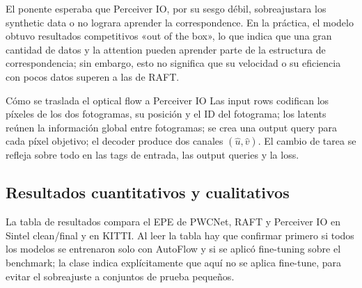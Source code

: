 El ponente esperaba que Perceiver IO, por su sesgo débil, sobreajustara los synthetic data o no lograra aprender la correspondence. En la práctica, el modelo obtuvo resultados competitivos «out of the box», lo que indica que una gran cantidad de datos y la attention pueden aprender parte de la estructura de correspondencia; sin embargo, esto no significa que su velocidad o su eficiencia con pocos datos superen a las de RAFT.



\begin{importantbox}{Cómo se traslada el optical flow a Perceiver IO}
Las input rows codifican los píxeles de los dos fotogramas, su posición y el ID del fotograma; los latents reúnen la información global entre fotogramas; se crea una output query para cada píxel objetivo; el decoder produce dos canales $(\hat u,\hat v)$. El cambio de tarea se refleja sobre todo en las tags de entrada, las output queries y la loss.
\end{importantbox}

\subsection{Resultados cuantitativos y cualitativos}

La tabla de resultados compara el EPE de PWCNet, RAFT y Perceiver IO en Sintel clean/final y en KITTI. Al leer la tabla hay que confirmar primero si todos los modelos se entrenaron solo con AutoFlow y si se aplicó fine-tuning sobre el benchmark; la clase indica explícitamente que aquí no se aplica fine-tune, para evitar el sobreajuste a conjuntos de prueba pequeños.


